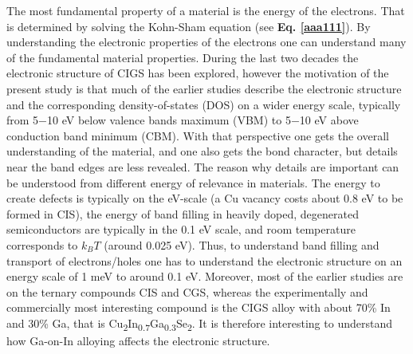 \documentclass[a4paper, 12pt, titlepage,oneside,drop]{kthesis}
\begin{document}
The most fundamental property of a material is the energy of the electrons. That is determined by solving the Kohn-Sham equation (see \textbf{Eq. \ref{aaa111}}). By understanding the electronic properties of the electrons one 
can understand many of the fundamental material properties. During the last two decades the electronic structure of CIGS has been explored, however the motivation of the present study is that much of the earlier studies describe 
the electronic structure and the corresponding density-of-states (DOS) on a wider energy scale, typically from 5$-$10 eV below valence bands maximum (VBM) to 5$-$10 eV above conduction band minimum (CBM). With that perspective one
gets the overall understanding of the material, and one also gets the bond character, but details near the band edges are less revealed. The reason why details are important can be understood from different energy of relevance in
materials. The energy to create defects is typically on the eV-scale (a Cu vacancy costs about 0.8 eV to be formed in CIS), the energy of band filling in heavily doped, degenerated semiconductors are typically in the 0.1 eV scale, and
room temperature corresponds to $k_BT $ (around 0.025 eV). Thus, to understand band filling and transport of electrons/holes one has to understand the electronic structure on an energy scale of 1 meV to around 0.1 eV. Moreover, most of the
earlier studies are on the ternary compounds CIS and CGS, whereas the experimentally and commercially most interesting compound is the CIGS alloy with about 70\% In and 30\% Ga, that is
Cu\textsubscript{2}In\textsubscript{0.7}Ga\textsubscript{0.3}Se\textsubscript{2}. It is therefore interesting to understand how Ga-on-In alloying affects the electronic structure.   
\end{document}
